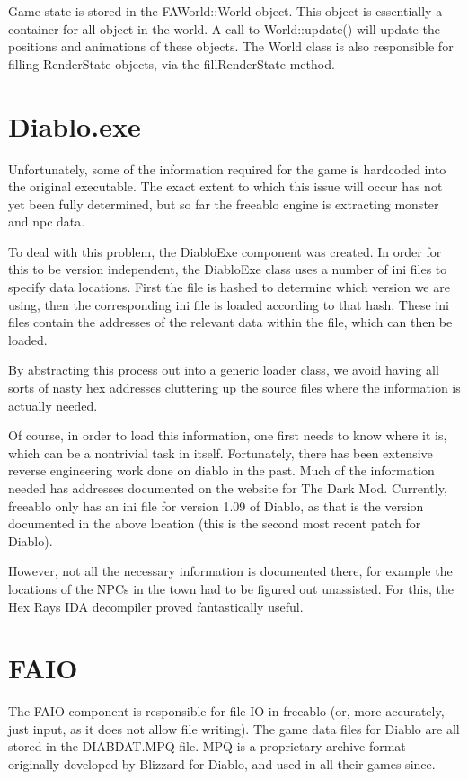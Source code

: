 	Game state is stored in the FAWorld::World object. This object is essentially a container for all object in the world. A call to World::update() will update the positions and animations of these objects.
	The World class is also responsible for filling RenderState objects, via the fillRenderState method.
	
\section{Diablo.exe}
	Unfortunately, some of the information required for the game is hardcoded into the original executable.
	The exact extent to which this issue will occur has not yet been fully determined, but so far the freeablo engine is extracting monster and npc data.
	
	To deal with this problem, the DiabloExe component was created. In order for this to be version independent, the DiabloExe class uses a number of ini files to specify data locations. First the file is hashed to determine which version we are using, then the corresponding ini file is loaded according to that hash. These ini files contain the addresses of the relevant data within the file, which can then be loaded.
	
	By abstracting this process out into a generic loader class, we avoid having all sorts of nasty hex addresses cluttering up the source files where the information is actually needed.
	
	Of course, in order to load this information, one first needs to know where it is, which can be a nontrivial task in itself. Fortunately, there has been extensive reverse engineering work done on diablo in the past. Much of the information needed has addresses documented on the website for The Dark Mod\cite{dmodhex}. Currently, freeablo only has an ini file for version 1.09 of Diablo, as that is the version documented in the above location (this is the second most recent patch for Diablo).
	
	However, not all the necessary information is documented there, for example the locations of the NPCs in the town had to be figured out unassisted. For this, the Hex Rays IDA\cite{hexrays} decompiler proved fantastically useful.

\section{FAIO}
	The FAIO component is responsible for file IO in freeablo (or, more accurately, just input, as it does not allow file writing).
	The game data files for Diablo are all stored in the DIABDAT.MPQ file. MPQ is a proprietary archive format originally developed by Blizzard for Diablo, and used in all their games since.
	
